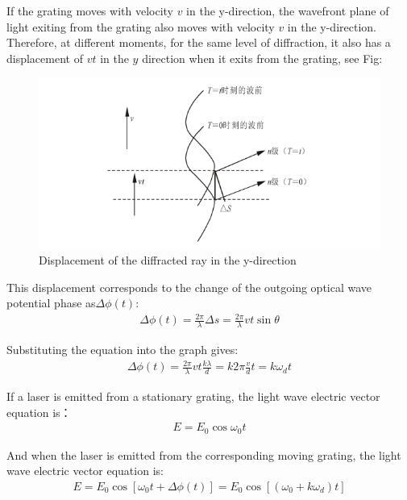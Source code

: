 \documentclass[UTF8]{article}
\begin{document}
  If the grating moves with velocity $v$ in the y-direction, the wavefront plane of light exiting from the grating also moves with velocity $v$ in the y-direction. Therefore, at different moments, for the same level of diffraction, it also has a displacement of $vt$ in the $y$ direction when it exits from the grating, see Fig:
	\begin{figure}[H]
	    	\centering
	    	\includegraphics[clip,scale=1,trim={0 0 0 0}]{fig/fig3.png}
	        \caption{Displacement of the diffracted ray in the y-direction}
	        \label{figure.3}
    \end{figure} 
   
   This displacement corresponds to the change of the outgoing optical wave potential phase as$\Delta \phi (t)$:
   \begin{eqnarray}
   \Delta \phi(t)=\frac{2 \pi}{\lambda} \Delta s=\frac{2 \pi}{\lambda} v t \sin \theta
   \end{eqnarray}
   
   Substituting the equation into the graph gives:
   \begin{eqnarray}
   \Delta \phi(t)=\frac{2 \pi}{\lambda} v t \frac{k \lambda}{d}=k 2 \pi \frac{v}{d} t=k \omega_{d} t
   \end{eqnarray}
   
   If a laser is emitted from a stationary grating, the light wave electric vector equation is：
   \begin{eqnarray}
   E=E_{0} \cos \omega_{0} t
   \end{eqnarray}
   
   And when the laser is emitted from the corresponding moving grating, the light wave electric vector equation is:
   \begin{eqnarray}
   E=E_{0} \cos \left[\omega_{0} t+\Delta \phi(t)\right]=E_{0} \cos \left[\left(\omega_{0}+k \omega_{d}\right) t\right]
   \end{eqnarray}
   
\end{document}
